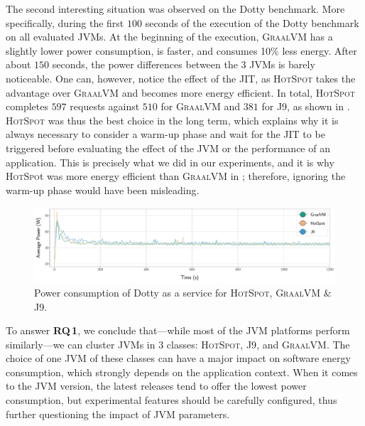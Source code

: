 The second interesting situation was observed on the \textsf{Dotty} benchmark.
More specifically, during the first $100$ seconds of the execution of the \textsf{Dotty} benchmark on all evaluated JVMs.
At the beginning of the execution, \textsc{GraalVM} has a slightly lower power consumption, is faster, and consumes 10\% less energy.
After about $150$ seconds, the power differences between the 3 JVMs is barely noticeable.
One can, however, notice the effect of the JIT, as \textsc{HotSpot} takes the advantage over \textsc{GraalVM} and becomes more energy efficient.
In total, \textsc{HotSpot} completes $597$ requests against $510$ for \textsc{GraalVM} and $381$ for \textsc{J9}, as shown in .
\textsc{HotSpot} was thus the best choice in the long term, which explains why it is always necessary to consider a warm-up phase and wait for the JIT to be triggered before evaluating the effect of the JVM or the performance of an application.
This is precisely what we did in our experiments, and it is why \textsc{HotSpo}t was more energy efficient than \textsc{GraalVM} in ; therefore, ignoring the warm-up phase would have been misleading.

\begin{figure}%
    \includegraphics[width=.9\linewidth]{imgs/powers_chetemi-2-dotty.pdf}
    \centering
    \captionsetup{justification=centering}
    \caption{Power consumption of \textsf{Dotty} as a service for \textsc{HotSpot}, \textsc{GraalVM} \& \textsc{J9}.}
    \label{fig:servicedotty}
\end{figure}
\begin{mdframed}[]
    To answer \textbf{RQ\,1}, we conclude that---while most of the JVM platforms perform similarly---we can cluster JVMs in 3 classes: \textsc{HotSpot}, \textsc{J9}, and \textsc{GraalVM}.
    The choice of one JVM of these classes can have a major impact on software energy consumption, which strongly depends on the application context.
    When it comes to the JVM version, the latest releases tend to offer the lowest power consumption, but experimental features should be carefully configured, thus further questioning the impact of JVM parameters.
\end{mdframed}

